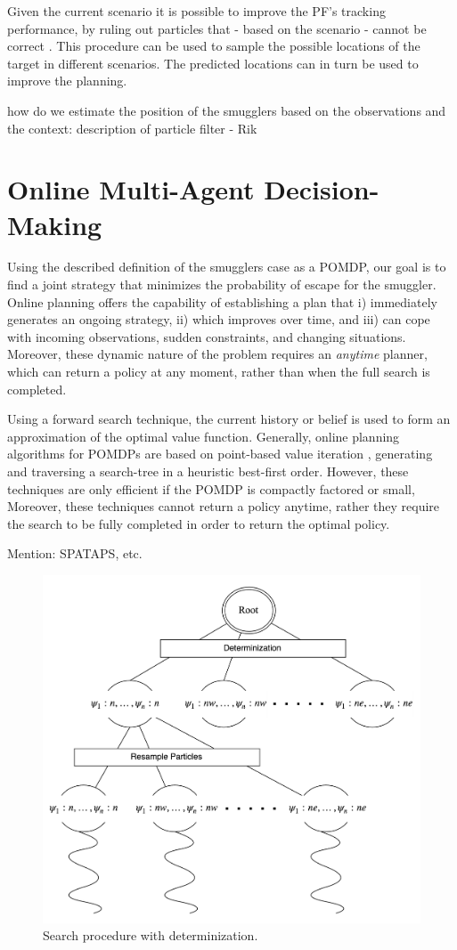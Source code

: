 \documentclass[conference]{IEEEtran}
\begin{document}
Given the current scenario it is possible to improve the PF's tracking performance, by ruling out particles that - based on the scenario - cannot be correct \cite{deOude2014}. This procedure can be used to sample the possible locations of the target in different scenarios. The predicted locations can in turn be used to improve the planning.

{\red how do we estimate the position of the smugglers based on the observations and the context: description of particle filter - Rik}

\section{Online Multi-Agent Decision-Making}
\label{sec:ma-dec-mak}

Using the described definition of the smugglers case as a POMDP, our goal is to find a joint strategy that minimizes the probability of escape for the smuggler. Online planning offers the capability of establishing a plan that i) immediately generates an ongoing strategy, ii) which improves over time, and iii) can cope with incoming observations, sudden constraints, and changing situations. Moreover, these dynamic nature of the problem requires an {\it anytime} planner, which can return a policy at any moment, rather than when the full search is completed.

Using a forward search technique, the current history or belief is used to form an approximation of the optimal value function. Generally, online planning algorithms for POMDPs are based on point-based value iteration \cite{pineau2006anytime,ross2008online}, generating and traversing a search-tree in a heuristic best-first order. However, these techniques are only efficient if the POMDP is compactly factored or small, Moreover, these techniques cannot return a policy anytime, rather they require the search to be fully completed in order to return the optimal policy.

{\red Mention: SPATAPS, etc.}

\begin{figure}
\begin{center}
 \includegraphics[width=.45\textwidth]{img/searchtree.png}
 \caption{Search procedure with determinization.}\label{fig:searchtree}
\end{center}
\end{figure}
\end{document}
